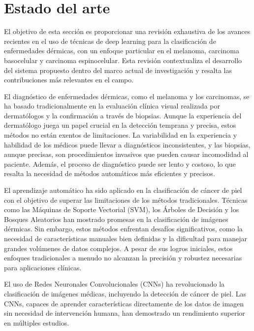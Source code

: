 \documentclass[12pt]{article}
\begin{document}
\section{Estado del arte}
El objetivo de esta sección es proporcionar una revisión exhaustiva de los avances recientes en el uso de técnicas de deep learning 
para la clasificación de enfermedades dérmicas, con un enfoque particular en el melanoma, carcinoma basocelular y carcinoma 
espinocelular. Esta revisión contextualiza el desarrollo del sistema propuesto dentro del marco actual de investigación y resalta 
las contribuciones más relevantes en el campo.

El diagnóstico de enfermedades dérmicas, como el melanoma y los carcinomas, se ha basado tradicionalmente en la evaluación clínica 
visual realizada por dermatólogos y la confirmación a través de biopsias. Aunque la experiencia del dermatólogo juega un papel 
crucial en la detección temprana y precisa, estos métodos no están exentos de limitaciones. La variabilidad en la experiencia 
y habilidad de los médicos puede llevar a diagnósticos inconsistentes, y las biopsias, aunque precisas, son procedimientos 
invasivos que pueden causar incomodidad al paciente. Además, el proceso de diagnóstico puede ser lento y costoso, lo que resalta 
la necesidad de métodos automáticos más eficientes y precisos.

El aprendizaje automático ha sido aplicado en la clasificación de cáncer de piel con el objetivo de superar las limitaciones de 
los métodos tradicionales. Técnicas como las Máquinas de Soporte Vectorial (SVM), los Árboles de Decisión y los Bosques Aleatorios 
han mostrado promesas en la clasificación de imágenes dérmicas. Sin embargo, estos métodos enfrentan desafíos significativos, 
como la necesidad de características manuales bien definidas y la dificultad para manejar grandes volúmenes de datos complejos. 
A pesar de sus logros iniciales, estos enfoques tradicionales a menudo no alcanzan la precisión y robustez necesarias para aplicaciones clínicas.

El uso de Redes Neuronales Convolucionales (CNNs) ha revolucionado la clasificación de imágenes médicas, incluyendo la detección de 
cáncer de piel. Las CNNs, capaces de aprender características directamente de los datos de imagen sin necesidad de intervención humana, 
han demostrado un rendimiento superior en múltiples estudios.
\end{document}
